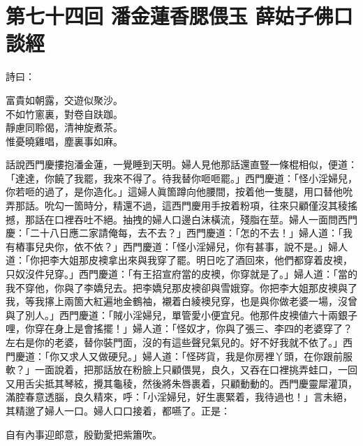 
\chapter*{第七十四回 潘金蓮香腮偎玉 薛姑子佛口談經}


詩曰：

\begin{myquote}
富貴如朝露，交遊似聚沙。\\不如竹窻裏，對卷自趺跏。\\靜慮同聆偈，清神旋煮茶。\\惟憂曉雞唱，塵裏事如麻。
\end{myquote}

話說西門慶摟抱潘金蓮，一覺睡到天明。婦人見他那話還直豎一條棍相似，便道：「達達，你饒了我罷，我來不得了。{}待我替你咂咂罷。」西門慶道：「怪小淫婦兒，你若咂的過了，是你造化。」這婦人眞箇蹲向他腰間，按着他一隻腿，用口替他吮弄那話。吮勾一箇時分，精還不過，這西門慶用手按着粉項，往來只顧僅沒其稜搖撼，那話在口裡吞吐不絕。抽拽的婦人口邊白沫橫流，殘脂在莖。婦人一面問西門慶：「二十八日應二家請俺每，去不去？」西門慶道：「怎的不去！」婦人道：「我有樁事兒央你，依不依？」{}西門慶道：「怪小淫婦兒，你有甚事，說不是。」婦人道：「你把李大姐那皮襖拿出來與我穿了罷。明日吃了酒回來，他們都穿着皮襖，只奴沒件兒穿。」西門慶道：「有王招宣府當的皮襖，你穿就是了。」婦人道：「當的我不穿他，你與了李嬌兒去。把李嬌兒那皮襖卻與雪娥穿。你把李大姐那皮襖與了我，等我㩟上兩箇大紅遍地金鶴袖，襯着白綾襖兒穿，也是與你做老婆一場，沒曾與了別人。」{}西門慶道：「賊小淫婦兒，單管愛小便宜兒。他那件皮襖値六十兩銀子哩，你穿在身上是會搖擺！」婦人道：「怪奴才，你與了張三、李四的老婆穿了？左右是你的老婆，替你裝門面，沒的有這些聲兒氣兒的。好不好我就不依了。」西門慶道：「你又求人又做硬兒。」婦人道：「怪硶貨，我是你房裡丫頭，在你跟前服軟？」一面說着，把那話放在粉臉上只顧偎晃，良久，又吞在口裡挑弄蛙口，一回又用舌尖抵其琴絃，攪其龜稜，然後將朱唇裹着，只顧動動的。西門慶靈犀灌頂，滿腔春意透腦，良久精來，呼：「小淫婦兒，好生裹緊着，我待過也！」言未絕，其精邈了婦人一口。婦人口口接着，都嚥了。正是：

\begin{myquote}
自有內事迎郎意，殷勤愛把紫簫吹。
\end{myquote}

